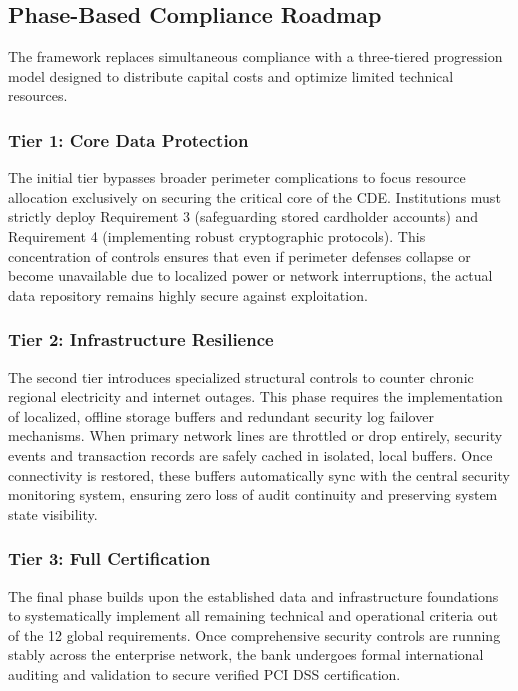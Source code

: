 \documentclass[12pt,a4paper,oneside]{report}
\begin{document}
	\subsection{Phase-Based Compliance Roadmap}
	The framework replaces simultaneous compliance with a three-tiered progression model designed to distribute capital costs and optimize limited technical resources.
	
	\subsubsection{Tier 1: Core Data Protection}
	The initial tier bypasses broader perimeter complications to focus resource allocation exclusively on securing the critical core of the CDE. Institutions must strictly deploy Requirement 3 (safeguarding stored cardholder accounts) and Requirement 4 (implementing robust cryptographic protocols). This concentration of controls ensures that even if perimeter defenses collapse or become unavailable due to localized power or network interruptions, the actual data repository remains highly secure against exploitation.
	
	\subsubsection{Tier 2: Infrastructure Resilience}
	The second tier introduces specialized structural controls to counter chronic regional electricity and internet outages. This phase requires the implementation of localized, offline storage buffers and redundant security log failover mechanisms. When primary network lines are throttled or drop entirely, security events and transaction records are safely cached in isolated, local buffers. Once connectivity is restored, these buffers automatically sync with the central security monitoring system, ensuring zero loss of audit continuity and preserving system state visibility.
	
	\subsubsection{Tier 3: Full Certification}
	The final phase builds upon the established data and infrastructure foundations to systematically implement all remaining technical and operational criteria out of the 12 global requirements. Once comprehensive security controls are running stably across the enterprise network, the bank undergoes formal international auditing and validation to secure verified PCI DSS certification.
	
\end{document}
